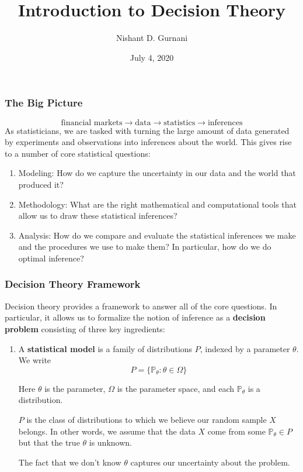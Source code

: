 \documentclass[10pt]{beamer}
\title[Statistical Decision Theory]{Introduction to Decision Theory}
\author{Nishant D. Gurnani}
\date{July 4, 2020}
\begin{document}
\begin{frame}
\titlepage	
\end{frame}


\begin{frame}
\frametitle{The Big Picture}
$$\text{financial markets} \rightarrow \text{data} \rightarrow \text{statistics} \rightarrow \text{inferences}$$
\newline 
As statisticians, we are tasked with turning the large amount of data generated by experiments and observations into inferences about the world.
\newline
\newline
This gives rise to a number of core statistical questions:
\newline

\begin{enumerate}

\item{Modeling: How do we capture the uncertainty in our data and the world that produced it?}
\newline
\item{Methodology: What are the right mathematical and computational tools that allow us to draw these statistical inferences?}
\newline
\item{Analysis: How do we compare and evaluate the statistical inferences we make and the procedures we use to make them? In particular, how do we do optimal inference?}	
\newline
\end{enumerate}

\end{frame}

\begin{frame}
\frametitle{Decision Theory Framework}
Decision theory provides a framework to answer all of the core questions.
\newline
In particular, it allows us to formalize the notion of inference as a \textbf{decision problem} consisting of three key ingredients:
\newline
\begin{enumerate}
\item{A \textbf{statistical model} is a family of distributions $P$, indexed by a parameter $\theta$. We write $$ P = \{\mathbb{P}_{\theta} : \theta \in \Omega\}$$}

Here $\theta$ is the parameter, $\Omega$ is the parameter space, and each $\mathbb{P}_{\theta}$ is a distribution.\newline

$P$ is the class of distributions to which we believe our random sample $X$ belongs. In other words, we assume that the data $X$ come from some $\mathbb{P}_{\theta} \in P$ but that the true $\theta$ is unknown. \newline 

The fact that we don't know $\theta$ captures our uncertainty about the problem.    
 
\end{enumerate}
\end{frame}
\end{document}

